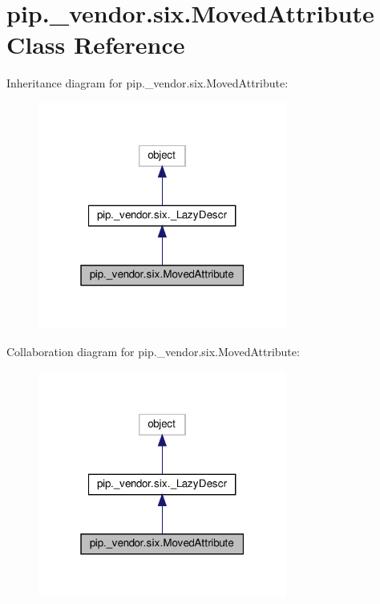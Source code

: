 \hypertarget{classpip_1_1__vendor_1_1six_1_1MovedAttribute}{}\section{pip.\+\_\+vendor.\+six.\+Moved\+Attribute Class Reference}
\label{classpip_1_1__vendor_1_1six_1_1MovedAttribute}


Inheritance diagram for pip.\+\_\+vendor.\+six.\+Moved\+Attribute\+:
\nopagebreak
\begin{figure}[H]
\begin{center}
\leavevmode
\includegraphics[width=232pt]{classpip_1_1__vendor_1_1six_1_1MovedAttribute__inherit__graph}
\end{center}
\end{figure}


Collaboration diagram for pip.\+\_\+vendor.\+six.\+Moved\+Attribute\+:
\nopagebreak
\begin{figure}[H]
\begin{center}
\leavevmode
\includegraphics[width=232pt]{classpip_1_1__vendor_1_1six_1_1MovedAttribute__coll__graph}
\end{center}
\end{figure}
